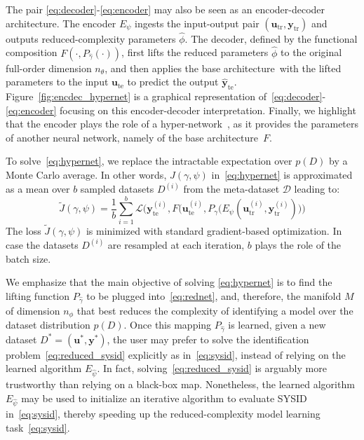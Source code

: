 \documentclass{article}
\newcommand{\base}{{base architecture}}
\newcommand{\ii}{{(i)}}
\newcommand{\tr}{\mathrm{tr}}
\newcommand{\te}{\mathrm{te}}
\newcommand{\seq}[1]{{\mathbf{#1}}}
\newcommand{\D}{D}
\newcommand{\redpar}{\phi}
\newcommand{\projpar}{\gamma}
\newcommand{\encpar}{\psi}
\newcommand{\loss}{\mathcal{L}}
\newtheorem{remark}{Remark}%
\newcommand{\DD}{\mathcal{D}}
\begin{document}
The pair \eqref{eq:decoder}-\eqref{eq:encoder} may also be seen as an encoder-decoder architecture. The encoder $E_\encpar$ ingests the input-output pair $(\seq u_\tr , \seq y_\tr )$ and outputs reduced-complexity parameters $\hat \redpar$. The decoder, defined by the functional composition $F(\cdot, P_{\hat \projpar}(\cdot))$, first lifts the reduced parameters  $\hat \phi$ to the original full-order dimension $n_\theta$, and then applies the \base\ with the lifted parameters to the input $\seq u_\te $ to predict the output $\hat {\seq y}_\te $. Figure~\ref{fig:encdec_hypernet} is a graphical representation of~\eqref{eq:decoder}-\eqref{eq:encoder}
focusing on this encoder-decoder interpretation. Finally, we highlight that the encoder plays the role of a hyper-network~\cite{ha2016hypernetworks}, as it provides the parameters of another neural network, namely of the \base\ $F$.

To solve~\eqref{eq:hypernet}, we replace the intractable expectation over $p(\D)$
by a Monte Carlo average. In other words, $J(\gamma, \psi)$ in~\eqref{eq:hypernet} is approximated as a mean  over $b$ sampled datasets $D^\ii$ from the meta-dataset $\DD$ leading to:
\begin{equation}
    \label{eq:monte_carlo}
    \tilde J(\gamma, \psi) = \frac{1}{b} \sum_{i=1}^b \loss\bigg(\seq y_\te^\ii, F\big(\seq u_\te^\ii, P_\projpar(E_\psi(\seq u_\tr^\ii, \seq y_\tr^\ii)\big ) \bigg)
\end{equation}
The loss $ \tilde J(\gamma, \psi)$ is minimized with standard gradient-based optimization. In case the datasets $D^\ii$ are resampled at each iteration, $b$ plays the role of the batch size.

We emphasize that the main objective of solving \eqref{eq:hypernet} is to find the lifting function $P_{\hat \projpar}$ to be plugged into~\eqref{eq:rednet}, and, therefore, the manifold $M$ of dimension $n_\redpar$ that best reduces the complexity of identifying a model over the dataset distribution $p(\D)$.
Once this mapping $P_{\hat \projpar}$ is learned, given a new dataset $D^* = (\seq{u}^*, \seq{y}^*)$, the user may prefer to solve the identification problem~\eqref{eq:reduced_sysid} explicitly as in~\eqref{eq:sysid}, instead of relying on the learned algorithm $E_{\hat \encpar}$. In fact, solving~\eqref{eq:reduced_sysid} is arguably more trustworthy than relying on a black-box map. Nonetheless, the learned algorithm $E_{\hat \encpar}$ may be used to initialize an iterative algorithm to evaluate SYSID in~\eqref{eq:sysid}, thereby speeding up the reduced-complexity model learning task~\eqref{eq:sysid}.%
\end{document}
